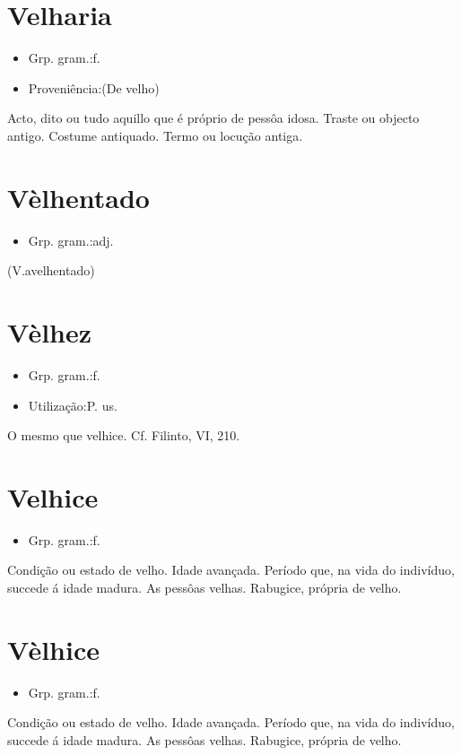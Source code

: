 \documentclass{article}
\begin{document}
\section{Velharia}
\begin{itemize}
\item {Grp. gram.:f.}
\end{itemize}
\begin{itemize}
\item {Proveniência:(De \textunderscore velho\textunderscore )}
\end{itemize}
Acto, dito ou tudo aquillo que é próprio de pessôa idosa.
Traste ou objecto antigo.
Costume antiquado.
Termo ou locução antiga.
\section{Vèlhentado}
\begin{itemize}
\item {Grp. gram.:adj.}
\end{itemize}
(V.avelhentado)
\section{Vèlhez}
\begin{itemize}
\item {Grp. gram.:f.}
\end{itemize}
\begin{itemize}
\item {Utilização:P. us.}
\end{itemize}
O mesmo que \textunderscore velhice\textunderscore . Cf. Filinto, VI, 210.
\section{Velhice}
\begin{itemize}
\item {Grp. gram.:f.}
\end{itemize}
Condição ou estado de velho.
Idade avançada.
Período que, na vida do indivíduo, succede á idade madura.
As pessôas velhas.
Rabugice, própria de velho.
\section{Vèlhice}
\begin{itemize}
\item {Grp. gram.:f.}
\end{itemize}
Condição ou estado de velho.
Idade avançada.
Período que, na vida do indivíduo, succede á idade madura.
As pessôas velhas.
Rabugice, própria de velho.
\end{document}
